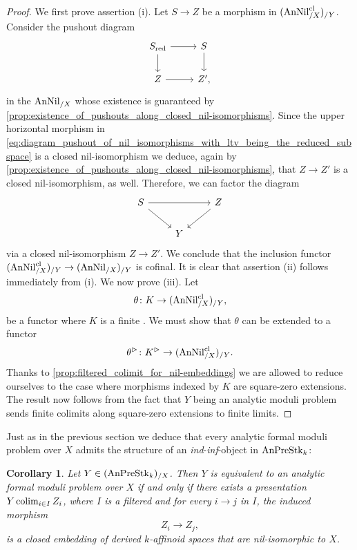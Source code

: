 \documentclass[10pt,a4paper,reqno]{amsart} %
\theoremstyle{plain}
\newtheorem{cor}[thm]{Corollary}
\theoremstyle{definition}
\theoremstyle{remark}
\numberwithin{equation}{section}
\begin{document}
\begin{proof}
    We first prove assertion (i). Let $S \to Z$ be a morphism in $(\mathrm{AnNil}^{\mathrm{cl}}_{/X})_{/Y}$. Consider the pushout diagram
        \begin{equation} \label{eq:diagram_pushout_of_nil_isomorphisms_with_ltv_being_the_reduced_subspace}
        \begin{tikzcd}
            S_\red \ar{r} \ar{d} & S \ar{d} \\
            Z \ar{r} & Z',
        \end{tikzcd}
        \end{equation}
    in the \infcat $\mathrm{AnNil}_{/X}$ whose existence is guaranteed by \cref{prop:existence_of_pushouts_along_closed_nil-isomorphisms}. Since
    the upper horizontal morphism in \eqref{eq:diagram_pushout_of_nil_isomorphisms_with_ltv_being_the_reduced_subspace} is a closed nil-isomorphism
    we deduce, again by \cref{prop:existence_of_pushouts_along_closed_nil-isomorphisms}, that $Z \to Z'$ is a closed nil-isomorphism, as well. Therefore, we can factor the diagram
        \[
        \begin{tikzcd}
            S \ar{rr} \ar{rd} & & Z \ar{dl} \\
                &               Y       &  
        \end{tikzcd}
        \]
    via a closed nil-isomorphism $Z \to Z'$. We conclude that the inclusion functor $(\mathrm{AnNil}^{\mathrm{cl}}_{/X})_{/Y} \to (\mathrm{AnNil}_{/X})_{/Y}$ is cofinal.
    It is clear that assertion (ii) follows immediately from (i). We now prove (iii). Let 
        \[\theta \colon K \to (\mathrm{AnNil}^{\mathrm{cl}}_{/X})_{/Y},\]
    be a functor where
    $K$ is a finite \infcat. We must show that $\theta$ can be extended to a functor
        \[\theta^{\rhd} \colon K^{\rhd} \to (\mathrm{AnNil}^{\mathrm{cl}}_{/X})_{/Y}.\]
    Thanks to \cref{prop:filtered_colimit_for_nil-embeddings} we are allowed to reduce ourselves to the case where morphisms indexed by $K$
    are square-zero extensions. The result now follows from the fact that $Y$ being an analytic moduli problem sends finite colimits along square-zero extensions
    to finite limits.
\end{proof}

Just as in the previous section we deduce that every analytic formal moduli problem over $X$ admits the structure of an \emph{ind}-\emph{inf}-object
in $\mathrm{AnPreStk}_k$:

\begin{cor}
    Let $Y \in (\mathrm{AnPreStk}_k)_{/X}$. Then $Y$ is equivalent to an analytic formal moduli problem over $X$ if and only if there exists
    a presentation $Y \operatorname*{colim}_{i \in I} Z_i$, where $I$ is a filtered \infcat and for every $i \to j$ in $I$, the induced morphism
        \[
          Z_i \to Z_j,  
        \]
    is a closed embedding of derived $k$-affinoid spaces that are nil-isomorphic to $X$.
\end{cor}
\end{document}
